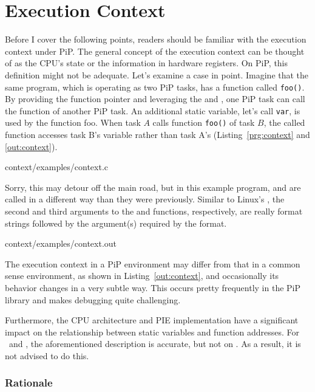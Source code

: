 
\section{Execution Context}\label{sec:context}

Before I cover the following points, readers should be familiar with
the execution context under PiP. The general concept of the execution
context can be thought of as the CPU's state or the information in
hardware registers. On PiP, this definition might not be
adequate. Let's examine a case in point. Imagine that the same
program, which is operating as two PiP tasks, has a function called
{\tt foo()}. By providing the function pointer and leveraging the 
 and , one PiP task
can call the function of another PiP task. An additional static
variable, let's call {\tt var}, is used by the function foo. When task
$A$ calls function {\tt foo()} of task $B$, the called function
accesses task B's variable rather than task A's
(Listing~\ref{prg:context} and \ref{out:context}). 

 {context/examples/context.c}

Sorry, this may detour off the main road, but in this example program,
 and 
 are called in a different way than they were
previously. Similar to Linux's , the second and third
arguments to the  and 
 functions, respectively, are
really format strings followed by the argument(s) required by the
format.
 

                {context/examples/context.out}

The execution context in a PiP environment may differ from that in a
common sense environment, as shown in Listing~\ref{out:context}, and
occasionally its behavior changes in a very subtle way. This occurs
pretty frequently in the PiP library and makes debugging quite
challenging. 

Furthermore, the CPU architecture and PIE implementation have a
significant impact on the relationship between static variables and
function addresses. For \AMD\ and \ARM, the aforementioned
description is accurate, but not on \INTEL. As a result, it is not
advised to do this.

\subsubsection*{Rationale}

